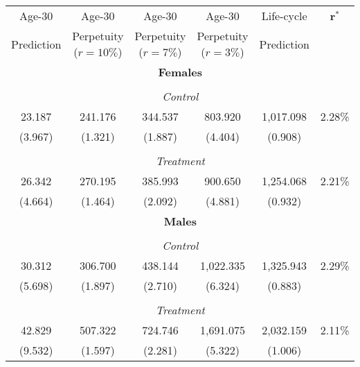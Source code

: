 \begin{tabular}{cccccc}
\toprule
Age-30 & Age-30 & Age-30 & Age-30 & Life-cycle & $\bm{r^*}$ \\
Prediction & Perpetuity ($r=10\%$) & Perpetuity ($r=7\%$) & Perpetuity ($r=3\%$) & Prediction &\\
 \midrule
\multicolumn{6}{c}{\textbf{Females}} \\ \\
\multicolumn{6}{c}{\emph{Control}} \\
23.187 &   241.176 &   344.537  &   803.920 &  1,017.098  & 2.28\% \\
(3.967) &     (1.321) &     (1.887) &     (4.404)  &     (0.908) & \\ \\
\multicolumn{6}{c}{\emph{Treatment}} \\
26.342 &   270.195 &   385.993 &   900.650 &  1,254.068  & 2.21\% \\
(4.664) &     (1.464) &    (2.092) &    (4.881) &    (0.932) &\\
\midrule
\multicolumn{6}{c}{\textbf{Males}} \\ \\
\multicolumn{6}{c}{\emph{Control}} \\
30.312 &   306.700 &   438.144 &  1,022.335 &  1,325.943 & 2.29\%  \\
(5.698) &    (1.897) &    (2.710) &    (6.324) &    (0.883)  &\\ \\
\multicolumn{6}{c}{\emph{Treatment}} \\
42.829 &   507.322 &   724.746 &  1,691.075  &  2,032.159 & 2.11\% \\
(9.532) &     (1.597) &     (2.281) &     (5.322) &     (1.006) &\\
\bottomrule
\end{tabular}
